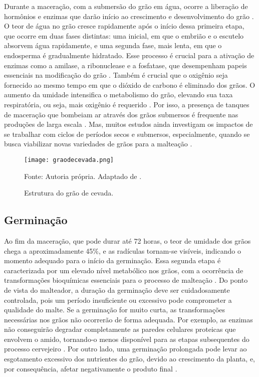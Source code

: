 Durante a maceração, com a submersão do grão em água, ocorre a liberação de hormônios e enzimas que darão início ao crescimento e desenvolvimento do grão \cite{LEWIS2012}. O teor de água no grão cresce rapidamente após o início dessa primeira etapa, que ocorre em duas fases distintas: uma inicial, em que o embrião e o escutelo absorvem água rapidamente, e uma segunda fase, mais lenta, em que o endosperma é gradualmente hidratado. Esse processo é crucial para a ativação de enzimas como a amilase, a ribonuclease e a fosfatase, que desempenham papeis essenciais na modificação do grão \cite{REYNOLDS1966}. Também é crucial que o oxigênio seja fornecido ao mesmo tempo em que o dióxido de carbono é eliminado dos grãos. O aumento da umidade intensifica o metabolismo do grão, elevando sua taxa respiratória, ou seja, mais oxigênio é requerido \cite{KUNZE1996}. Por isso, a presença de tanques de maceração que bombeiam ar através dos grãos submersos é frequente nas produções de larga escala \cite{CENCI2021}. Mas, muitos estudos ainda investigam os impactos de se trabalhar com ciclos de períodos secos e submersos, especialmente, quando se busca viabilizar novas variedades de grãos para a malteação \cite{MAYER2014,TURNER2019}.

\begin{figure}[ht]
    \centering
    \caption{Estrutura do grão de cevada.}
    \label{fig:graodecevada}
    \texttt{[image: graodecevada.png]}

    {\centering\footnotesize Fonte: Autoria própria. Adaptado de .\par}
\end{figure}



\subsection{Germinação}

Ao fim da maceração, que pode durar até 72 horas, o teor de umidade dos grãos chega a aproximadamente 45\%, e as radículas tornam-se visíveis, indicando o momento adequado para o início da germinação. Essa segunda etapa é caracterizada por um elevado nível metabólico nos grãos, com a ocorrência de transformações bioquímicas essenciais para o processo de malteação \cite{MALLETT2022}. Do ponto de vista do malteador, a duração da germinação deve ser cuidadosamente controlada, pois um período insuficiente ou excessivo pode comprometer a qualidade do malte. Se a germinação for muito curta, as transformações necessárias nos grãos não ocorrerão de forma adequada. Por exemplo, as enzimas não conseguirão degradar completamente as paredes celulares proteicas que envolvem o amido, tornando-o menos disponível para as etapas subsequentes do processo cervejeiro \cite{FOX2009}. Por outro lado, uma germinação prolongada pode levar ao esgotamento excessivo dos nutrientes do grão, devido ao crescimento da planta, e, por consequência, afetar negativamente o produto final \cite{LEWIS2012}.

